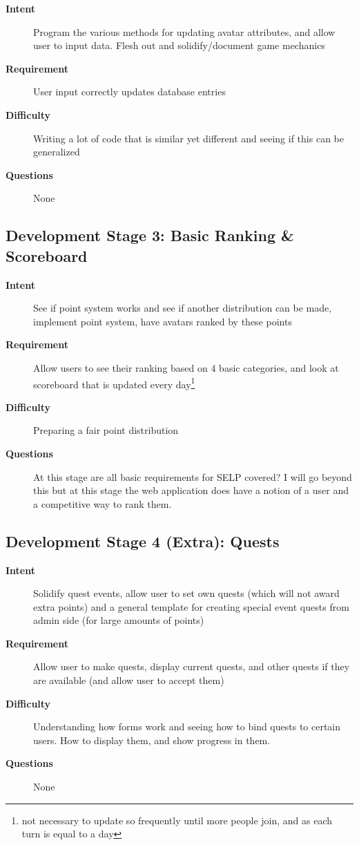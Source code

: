 \documentclass[11pt, a4paper]{article}
\begin{document}
\begin{description}
\item[\textbf{Intent}] Program the various methods for updating avatar attributes, and allow user to input data. Flesh out and solidify/document game mechanics
\item[\textbf{Requirement}] User input correctly updates database entries
\item[\textbf{Difficulty}] Writing a lot of code that is similar yet different and seeing if this can be generalized
\item[\textbf{Questions}] None
\end{description}

\subsection{Development Stage 3: Basic Ranking \& Scoreboard}

\begin{description}
\item[\textbf{Intent}] See if point system works and see if another distribution can be made, implement point system, have avatars ranked by these points
\item[\textbf{Requirement}] Allow users to see their ranking based on 4 basic categories, and look at scoreboard that is updated every day\footnote{not necessary to update so frequently until more people join, and as each turn is equal to a day}
\item[\textbf{Difficulty}] Preparing a fair point distribution
\item[\textbf{Questions}] At this stage are all basic requirements for SELP covered? I will go beyond this but at this stage the web application does have a notion of a user and a competitive way to rank them.
\end{description}

\subsection{Development Stage 4 (Extra): Quests}

\begin{description}
\item[\textbf{Intent}] Solidify quest events, allow user to set own quests (which will not award extra points) and a general template for creating special event quests from admin side (for large amounts of points)
\item[\textbf{Requirement}] Allow user to make quests, display current quests, and other quests if they are available (and allow user to accept them)
\item[\textbf{Difficulty}] Understanding how forms work and seeing how to bind quests to certain users. How to display them, and show progress in them.
\item[\textbf{Questions}] None
\end{description}
\end{document}

